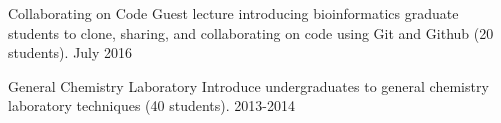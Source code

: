 
\begin{cvteaching}


  \cvteach
    {Collaborating on Code}
    {Guest lecture introducing bioinformatics graduate students to clone, sharing, and collaborating on code using Git and Github (20 students).}
    {July 2016}

  \cvteach
    {General Chemistry Laboratory}
    {Introduce undergraduates to general chemistry laboratory techniques (40 students).}
    {2013-2014}

\end{cvteaching}
